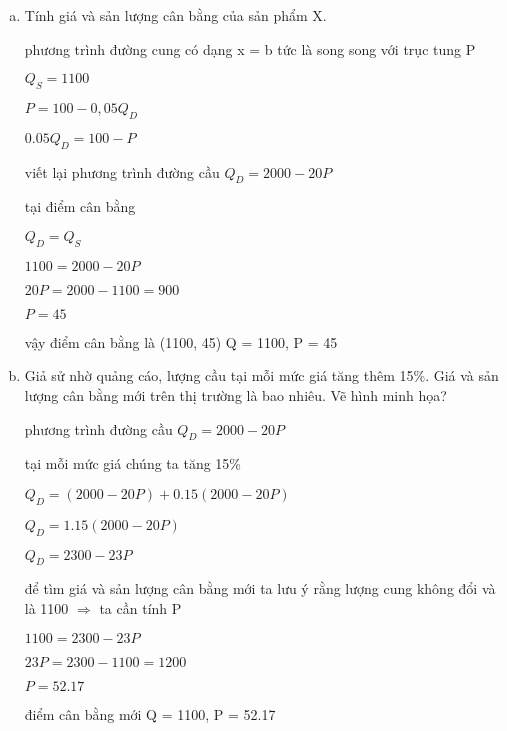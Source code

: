 \begin{enumerate}[a.]
    \item Tính giá và sản lượng cân bằng của sản phẩm X.
    
    phương trình đường cung có dạng
    x = b tức là song song với trục tung P

    $Q_S = 1100$

    $P = 100 - 0,05Q_D$

    $0.05Q_D = 100 - P$

    viết lại phương trình đường cầu
    $Q_D = 2000 - 20P$

    tại điểm cân bằng 

    $Q_D = Q_S$

    $1100 = 2000 - 20P$

    $20P = 2000 - 1100 = 900$

    $P = 45$

    vậy điểm cân bằng là 
    (1100, 45)
    Q = 1100, P = 45

    

    \item  Giả sử nhờ quảng cáo, lượng cầu tại mỗi mức giá tăng thêm 15\%. Giá và sản lượng 
    cân bằng mới trên thị trường là bao nhiêu. Vẽ hình minh họa?

    phương trình đường cầu
    $Q_D = 2000 - 20P$

    tại mỗi mức giá chúng ta tăng 15\%

    $Q_D = (2000 - 20P) + 0.15( 2000 - 20P)$

    $Q_D = 1.15(2000 - 20P)$

    $Q_D = 2300 - 23P$

    để tìm giá và sản lượng cân bằng mới 
    ta lưu ý rằng lượng cung không đổi và là 1100
    $\Rightarrow$ ta cần tính P

    $1100 = 2300 - 23P$

    $23P = 2300 - 1100 = 1200$

    $P = 52.17$

    điểm cân bằng mới 
    Q = 1100, P = 52.17


\end{enumerate}
